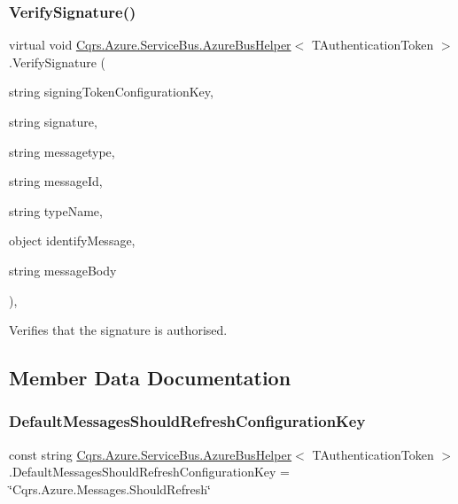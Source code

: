 \subsubsection{\texorpdfstring{Verify\+Signature()}{VerifySignature()}}
{\footnotesize\ttfamily virtual void \hyperlink{classCqrs_1_1Azure_1_1ServiceBus_1_1AzureBusHelper}{Cqrs.\+Azure.\+Service\+Bus.\+Azure\+Bus\+Helper}$<$ T\+Authentication\+Token $>$.Verify\+Signature (\begin{DoxyParamCaption}\item[{string}]{signing\+Token\+Configuration\+Key,  }\item[{string}]{signature,  }\item[{string}]{messagetype,  }\item[{string}]{message\+Id,  }\item[{string}]{type\+Name,  }\item[{object}]{identify\+Message,  }\item[{string}]{message\+Body }\end{DoxyParamCaption})\hspace{0.3cm}{\ttfamily [protected]}, {\ttfamily [virtual]}}



Verifies that the signature is authorised. 



\subsection{Member Data Documentation}
\mbox{\label{classCqrs_1_1Azure_1_1ServiceBus_1_1AzureBusHelper_a5d1dcc91b08727fbaee0ec6d32106b16_a5d1dcc91b08727fbaee0ec6d32106b16}} 
\subsubsection{\texorpdfstring{Default\+Messages\+Should\+Refresh\+Configuration\+Key}{DefaultMessagesShouldRefreshConfigurationKey}}
{\footnotesize\ttfamily const string \hyperlink{classCqrs_1_1Azure_1_1ServiceBus_1_1AzureBusHelper}{Cqrs.\+Azure.\+Service\+Bus.\+Azure\+Bus\+Helper}$<$ T\+Authentication\+Token $>$.Default\+Messages\+Should\+Refresh\+Configuration\+Key = \char`\"{}Cqrs.\+Azure.\+Messages.\+Should\+Refresh\char`\"{}\hspace{0.3cm}{\ttfamily [protected]}}



